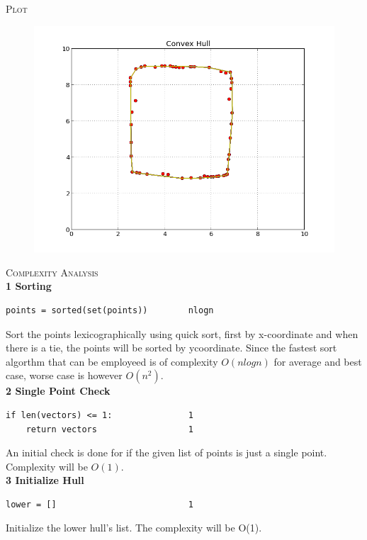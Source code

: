 \documentclass[pdftex,12pt,a4paper]{article}
\newcommand{\nspace}{\\[0.25cm]}
\newcommand{\lspace}{\\[0.50cm]}
\begin{document}
\newpage
\textsc{Plot} \hfill \nspace

\begin{figure}[h!]
  \centering
	\includegraphics[scale=0.65]{img/monotone_test_4.png}
\end{figure}




\textsc{\Large Complexity Analysis} \hfill \nspace

{\bf \large 1 Sorting}
\begin{verbatim}
points = sorted(set(points))        nlogn
\end{verbatim}

Sort the points lexicographically using quick sort, first by x-coordinate and when there is a tie, the points will be sorted by y\-coordinate. Since the fastest sort algorthm that can be employeed is of complexity $O(n log n)$ for average and best case, worse case is however $O(n^2)$.\lspace


{\bf \large 2 Single Point Check}
\begin{verbatim}
if len(vectors) <= 1:               1
    return vectors                  1
\end{verbatim}

An initial check is done for if the given list of points is just a single point. Complexity will be $O(1)$.\lspace


{\bf \large 3 Initialize Hull}
\begin{verbatim}
lower = []                          1
\end{verbatim}

Initialize the lower hull's list. The complexity will be O(1).\lspace
\end{document}
